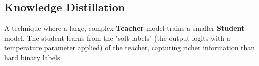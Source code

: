 \subsection{Knowledge Distillation}
A technique where a large, complex \textbf{Teacher} model trains a smaller \textbf{Student} model. The student learns from the "soft labels" (the output logits with a temperature parameter applied) of the teacher, capturing richer information than hard binary labels.
